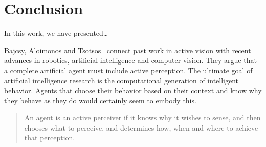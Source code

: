 \chapter{Conclusion}
\label{cha:conclusion}

% 

In this work, we have presented\dots

Bajcsy, Aloimonos and Tsotsos~\cite{bajcsy_revisiting_2018} connect past work in active vision with recent advances in robotics, artificial intelligence and computer vision.
They argue that a complete artificial agent must include active perception.
The ultimate goal of artificial intelligence research is the computational generation of intelligent behavior.
Agents that choose their behavior based on their context and know why they behave as they do would certainly seem to embody this.

\begin{quote}
    An agent is an active perceiver if it knows why it wishes to sense,
    and then chooses what to perceive, and determines how, when and where to achieve that perception.
\end{quote}
